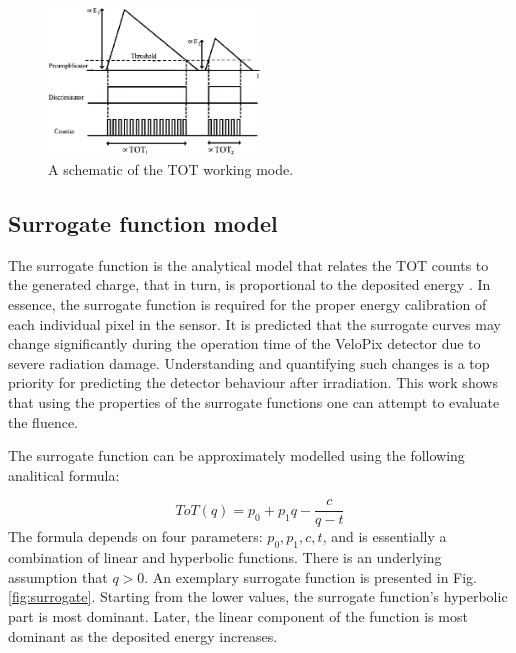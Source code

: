 \begin{figure}[H]
\centering
\includegraphics[width=0.5\textwidth]{figures/chapter4/surrogates/Schematic-of-the-time-over-threshold-working-mode.png}
\caption{A schematic of the TOT working mode.}
\label{fig:sur_tot}
\end{figure}

\subsection{Surrogate function model}
\label{surrogate_func}

The surrogate function is the analytical model that relates the TOT counts to the generated charge, that in turn, is proportional to the deposited energy \cite{Tsopelas:2016cjb}. In essence, the surrogate function is required for the proper energy calibration of each individual pixel in the sensor. It is predicted that the surrogate curves may change significantly during the operation time of the VeloPix detector due to severe radiation damage. Understanding and quantifying such changes is a top priority for predicting the detector behaviour after irradiation.
This work shows that using the properties of the surrogate functions one can attempt to evaluate the fluence.

The surrogate function can be approximately modelled using the following analitical formula:


\begin{equation}
  \label{eq:surrogate}
  ToT(q) = p_{0} + p_{1} q - \frac{c}{q-t}
  \end{equation}
The formula depends on four parameters: $p_{0},p_{1},c,t$, and is essentially a combination of linear and hyperbolic functions. There is an underlying assumption that $q > 0$.
An exemplary surrogate function is presented in Fig. \ref{fig:surrogate}.
Starting from the lower values, the surrogate function's hyperbolic part is most dominant. Later, the linear component of the function is most dominant as the deposited energy increases.

